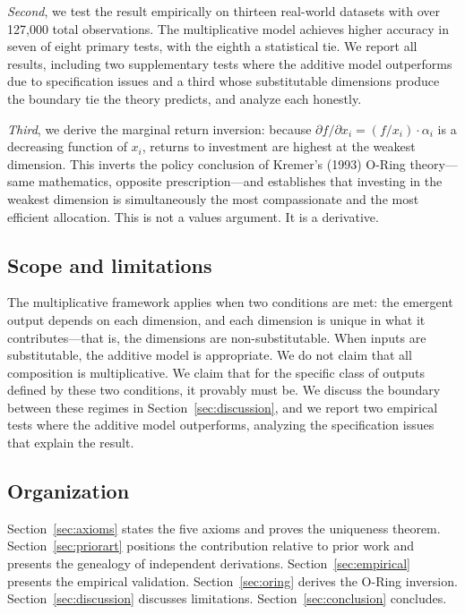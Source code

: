 \documentclass[12pt, a4paper]{article}
\theoremstyle{definition}
\theoremstyle{remark}
\begin{document}
\textit{Second}, we test the result empirically on thirteen real-world datasets with over 127,000 total observations. The multiplicative model achieves higher accuracy in seven of eight primary tests, with the eighth a statistical tie. We report all results, including two supplementary tests where the additive model outperforms due to specification issues and a third whose substitutable dimensions produce the boundary tie the theory predicts, and analyze each honestly.

\textit{Third}, we derive the marginal return inversion: because $\partial f / \partial x_i = (f / x_i) \cdot \alpha_i$ is a decreasing function of $x_i$, returns to investment are highest at the weakest dimension. This inverts the policy conclusion of Kremer's (1993) O-Ring theory---same mathematics, opposite prescription---and establishes that investing in the weakest dimension is simultaneously the most compassionate and the most efficient allocation. This is not a values argument. It is a derivative.

\subsection{Scope and limitations}

The multiplicative framework applies when two conditions are met: the emergent output depends on each dimension, and each dimension is unique in what it contributes---that is, the dimensions are non-substitutable. When inputs are substitutable, the additive model is appropriate. We do not claim that all composition is multiplicative. We claim that for the specific class of outputs defined by these two conditions, it provably must be. We discuss the boundary between these regimes in Section~\ref{sec:discussion}, and we report two empirical tests where the additive model outperforms, analyzing the specification issues that explain the result.

\subsection{Organization}

Section~\ref{sec:axioms} states the five axioms and proves the uniqueness theorem. Section~\ref{sec:priorart} positions the contribution relative to prior work and presents the genealogy of independent derivations. Section~\ref{sec:empirical} presents the empirical validation. Section~\ref{sec:oring} derives the O-Ring inversion. Section~\ref{sec:discussion} discusses limitations. Section~\ref{sec:conclusion} concludes.
\end{document}
